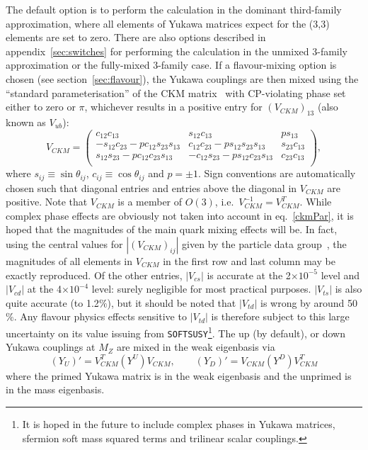 \documentclass{article}
\begin{document}
The default option is to perform the calculation in the 
dominant third-family approximation, where all elements of Yukawa matrices
expect for the (3,3) elements are set to zero.
There are also options described in
appendix~\ref{sec:switches} for performing the calculation in the unmixed
3-family approximation or the fully-mixed 3-family case.
If a flavour-mixing option is chosen (see section~\ref{sec:flavour}),
the Yukawa couplings are then mixed using the ``standard parameterisation''
of the CKM matrix~\cite{Groom:2000in} with CP-violating phase set either to
zero or $\pi$, whichever results in a positive entry for $(V_{CKM})_{13}$
(also known as $V_{ub}$):
\begin{equation}
V_{CKM} = \left( \begin{array} {ccc}
c_{12} c_{13}   & s_{12} c_{13}   & p s_{13} \\
-s_{12} c_{23} -p c_{12} s_{23} s_{13} & c_{12} c_{23} -p s_{12} s_{23} s_{13} & 
s_{23} c_{13} \\
s_{12} s_{23} - p c_{12} c_{23} s_{13} & -c_{12} s_{23} - p s_{12} c_{23} s_{13} &
c_{23} c_{13} \\
\end{array} \right), \label{ckmPar}
\end{equation}
where $s_{ij}\equiv \sin \theta_{ij}$, $c_{ij}\equiv \cos \theta_{ij}$ and
$p=\pm 1$. Sign conventions are automatically chosen such that diagonal entries and entries
above the diagonal in $V_{CKM}$ are positive. Note that $V_{CKM}$ is a member
of $O(3)$, i.e.\ $V_{CKM}^{-1}= V_{CKM}^T$.
While complex phase effects are obviously not taken into account in
eq.~\ref{ckmPar}, it is hoped that the magnitudes of the main quark mixing
effects will be. In fact, using the central values for $|(V_{CKM})_{ij}|$
given by 
the particle data group~\cite{Groom:2000in}, the magnitudes of all elements in
$V_{CKM}$ in the 
first row and last column may be exactly reproduced. Of the other entries, 
$|V_{cs}|$ is accurate at the 2$\times 10^{-5}$ level and
$|V_{cd}|$ at the 4$\times 10^{-4}$ level: surely negligible for most practical
purposes. $|V_{ts}|$ is also quite accurate (to 1.2$\%$), but 
it should be noted that $|V_{td}|$ is wrong by around 50$\%$. Any
flavour physics effects sensitive to $|V_{td}|$ is therefore subject to
this large uncertainty on its value issuing from {\tt SOFTSUSY}\footnote{It is
  hoped 
in the future to include complex phases in Yukawa matrices,
sfermion soft mass squared terms and trilinear scalar couplings.}.
The up (by default), or down Yukawa couplings at $M_Z$ are mixed in the
weak eigenbasis via
\begin{equation}
(Y_U)'=V_{CKM}^T (Y^U) V_{CKM}, \qquad 
(Y_D)'=V_{CKM} (Y^D) V_{CKM}^T \label{ckm}
\end{equation}
where the primed Yukawa matrix is in the weak eigenbasis and the unprimed is
in the mass eigenbasis. 
\end{document}
